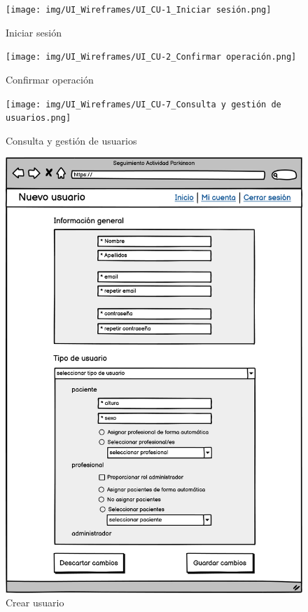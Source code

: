 \begin{figure}[h]
    \centering
    \texttt{[image: img/UI\_Wireframes/UI\_CU-1\_Iniciar sesión.png]}
    \caption{Iniciar sesión}
    \label{fig:Iniciar sesión}
\end{figure}

\begin{figure}[h]
    \centering
    \texttt{[image: img/UI\_Wireframes/UI\_CU-2\_Confirmar operación.png]}
    \caption{Confirmar operación}
    \label{fig:Confirmar operación}
\end{figure}

\begin{figure}[h]
    \centering
    \texttt{[image: img/UI\_Wireframes/UI\_CU-7\_Consulta y gestión de usuarios.png]}
    \caption{Consulta y gestión de usuarios}
    \label{fig:Consulta y gestión de usuarios}
\end{figure}

\begin{figure}[h]
    \centering
    \includegraphics[width=1\textwidth]{img/UI_Wireframes/UI_CU-9_Crear usuario.png}
    \caption{Crear usuario}
    \label{fig:Crear usuario}
\end{figure}

